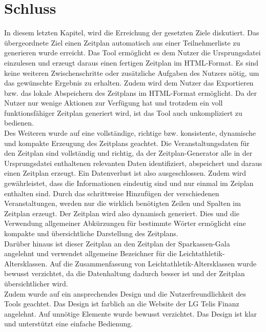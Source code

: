 
\chapter{Schluss}
\label{chap:Schluss}

In diesem letzten Kapitel, wird die Erreichung der gesetzten Ziele diskutiert.
Das übergeordnete Ziel einen Zeitplan automatisch aus einer Teilnehmerliste zu generieren wurde erreicht. Das Tool ermöglicht es dem Nutzer die Ursprungsdatei einzulesen und erzeugt daraus einen fertigen Zeitplan im HTML-Format. Es sind keine weiteren Zwischenschritte oder zusätzliche Aufgaben des Nutzers nötig, um das gewünschte Ergebnis zu erhalten. Zudem wird dem Nutzer das Exportieren bzw. das lokale Abspeichern des Zeitplans im HTML-Format ermöglicht. Da der Nutzer nur wenige Aktionen zur Verfügung hat und trotzdem ein voll funktionsfähiger Zeitplan generiert wird, ist das Tool auch unkompliziert zu bedienen.\\
Des Weiteren wurde auf eine vollständige, richtige bzw. konsistente, dynamische und kompakte Erzeugung des Zeitplans geachtet. Die Veranstaltungsdaten für den Zeitplan sind vollständig und richtig, da der Zeitplan-Generator alle in der Ursprungsdatei enthaltenen relevanten Daten identifiziert, abspeichert und daraus einen Zeitplan erzeugt. Ein Datenverlust ist also ausgeschlossen. Zudem wird gewährleistet, dass die Informationen eindeutig sind und nur einmal im Zeiplan enthalten sind. Durch das schrittweise Hinzufügen der verschiedenen Veranstaltungen, werden nur die wirklich benötigten Zeilen und Spalten im Zeitplan erzeugt. Der Zeitplan wird also dynamisch generiert. Dies und die Verwendung allgemeiner Abkürzungen für bestimmte Wörter ermöglicht eine kompakte und übersichtliche Darstellung des Zeitplans.\\
Darüber hinaus ist dieser Zeitplan an den Zeitplan der Sparkassen-Gala angelehnt und verwendet allgemeine Bezeichner für die Leichtathletik-Altersklassen. Auf die Zusammenfassung von Leichtathletik-Altersklassen wurde bewusst verzichtet, da die Datenhaltung dadurch besser ist und der Zeitplan übersichtlicher wird.\\
Zudem wurde auf ein ansprechendes Design und die Nutzerfreundlichkeit des Tools geachtet. Das Design ist farblich an die Website der LG Telis Finanz angelehnt. Auf unnötige Elemente wurde bewusst verzichtet. Das Design ist klar und unterstützt eine einfache Bedienung.\\
